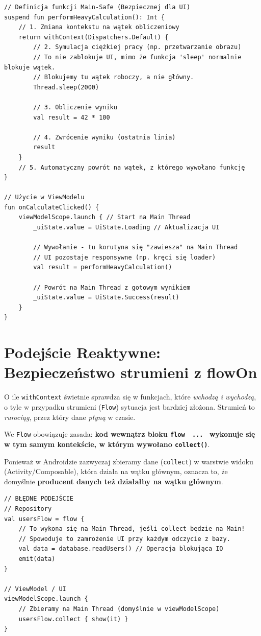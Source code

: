 \begin{verbatim}
// Definicja funkcji Main-Safe (Bezpiecznej dla UI)
suspend fun performHeavyCalculation(): Int {
    // 1. Zmiana kontekstu na wątek obliczeniowy
    return withContext(Dispatchers.Default) {
        // 2. Symulacja ciężkiej pracy (np. przetwarzanie obrazu)
        // To nie zablokuje UI, mimo że funkcja 'sleep' normalnie blokuje wątek.
        // Blokujemy tu wątek roboczy, a nie główny.
        Thread.sleep(2000) 
        
        // 3. Obliczenie wyniku
        val result = 42 * 100 
        
        // 4. Zwrócenie wyniku (ostatnia linia)
        result 
    }
    // 5. Automatyczny powrót na wątek, z którego wywołano funkcję
}

// Użycie w ViewModelu
fun onCalculateClicked() {
    viewModelScope.launch { // Start na Main Thread
        _uiState.value = UiState.Loading // Aktualizacja UI
        
        // Wywołanie - tu korutyna się "zawiesza" na Main Thread
        // UI pozostaje responsywne (np. kręci się loader)
        val result = performHeavyCalculation()
        
        // Powrót na Main Thread z gotowym wynikiem
        _uiState.value = UiState.Success(result)
    }
}
\end{verbatim}

\section{Podejście Reaktywne: Bezpieczeństwo strumieni z flowOn}

O ile \texttt{withContext} świetnie sprawdza się w funkcjach, które \textit{wchodzą i wychodzą}, o tyle w przypadku strumieni (\texttt{Flow}) sytuacja jest bardziej złożona. Strumień to \textit{rurociąg}, przez który dane \textit{płyną} w czasie.

We \texttt{Flow} obowiązuje zasada: \textbf{kod wewnątrz bloku \texttt{flow { ... }} wykonuje się w tym samym kontekście, w którym wywołano \texttt{collect()}}.

Ponieważ w Androidzie zazwyczaj zbieramy dane (\texttt{collect}) w warstwie widoku (Activity/Composable), która działa na wątku głównym, oznacza to, że domyślnie \textbf{producent danych też działałby na wątku głównym}.

\begin{verbatim}
// BŁĘDNE PODEJŚCIE
// Repository
val usersFlow = flow {
    // To wykona się na Main Thread, jeśli collect będzie na Main!
    // Spowoduje to zamrożenie UI przy każdym odczycie z bazy.
    val data = database.readUsers() // Operacja blokująca IO
    emit(data)
}

// ViewModel / UI
viewModelScope.launch { 
    // Zbieramy na Main Thread (domyślnie w viewModelScope)
    usersFlow.collect { show(it) } 
}
\end{verbatim}

